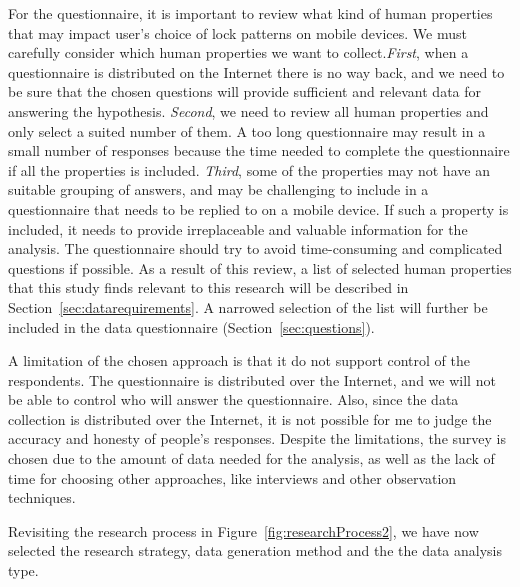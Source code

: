   For the questionnaire, it is important to review what kind of human properties that may impact user's choice of lock patterns on mobile devices. We must carefully consider which human properties we want to collect.{\it First}, when a questionnaire is distributed on the Internet there is no way back, and we need to be sure that the chosen questions will provide sufficient and relevant data for answering the hypothesis. {\it Second}, we need to review all human properties and only select a suited number of them. A too long questionnaire may result in a small number of responses because the time needed to complete the questionnaire if all the properties is included. {\it Third}, some of the properties may not have an suitable grouping of answers, and may be challenging to include in a questionnaire that needs to be replied to on a mobile device. If such a property is included, it needs to provide irreplaceable and valuable information for the analysis. The questionnaire should try to avoid time-consuming and complicated questions if possible. As a result of this review, a list of selected human properties that this study finds relevant to this research will be described in Section~\ref{sec:datarequirements}. A narrowed selection of the list will further be included in the data questionnaire (Section~\ref{sec:questions}).  
  
  A limitation of the chosen approach is that it do not support control of the respondents. The questionnaire is distributed over the Internet, and we will not be able to control who will answer the questionnaire. Also, since the data collection is distributed over the Internet, it is not possible for me to judge the accuracy and honesty of people's responses. Despite the limitations, the survey is chosen due to the amount of data needed for the analysis, as well as the lack of time for choosing other approaches, like interviews and other observation techniques. 

  Revisiting the research process in Figure~\ref{fig:researchProcess2}, we have now selected the research strategy, data generation method and the the data analysis type. 

